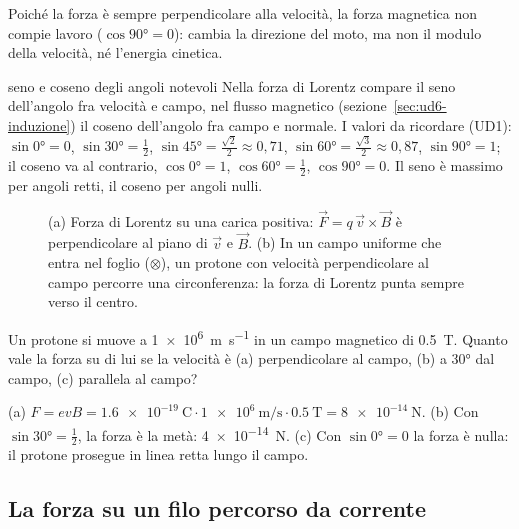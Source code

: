 Poiché la forza è sempre perpendicolare alla velocità, la forza magnetica non compie lavoro ($\cos\ang{90} = 0$): cambia la direzione del moto, ma non il modulo della velocità, né l'energia cinetica.

\begin{richiamo}{seno e coseno degli angoli notevoli}
Nella forza di Lorentz compare il seno dell'angolo fra velocità e campo, nel flusso magnetico (sezione~\ref{sec:ud6-induzione}) il coseno dell'angolo fra campo e normale. I valori da ricordare (UD1): $\sin\ang{0} = 0$, $\sin\ang{30} = \frac12$, $\sin\ang{45} = \frac{\sqrt2}{2} \approx 0{,}71$, $\sin\ang{60} = \frac{\sqrt3}{2} \approx 0{,}87$, $\sin\ang{90} = 1$; il coseno va al contrario, $\cos\ang{0} = 1$, $\cos\ang{60} = \frac12$, $\cos\ang{90} = 0$. Il seno è massimo per angoli retti, il coseno per angoli nulli.
\end{richiamo}

\begin{figure}[h]
\centering

\caption{(a) Forza di Lorentz su una carica positiva: $\vec F = q\,\vec v \times \vec B$ è perpendicolare al piano di $\vec v$ e $\vec B$. (b) In un campo uniforme che entra nel foglio ($\otimes$), un protone con velocità perpendicolare al campo percorre una circonferenza: la forza di Lorentz punta sempre verso il centro.}
\label{fig:ud6-lorentz}
\end{figure}

\begin{esempio}
Un protone si muove a \SI{1e6}{\metre\per\second} in un campo magnetico di \SI{0,5}{\tesla}. Quanto vale la forza su di lui se la velocità è (a) perpendicolare al campo, (b) a \ang{30} dal campo, (c) parallela al campo?

(a) $F = evB = \SI{1,6e-19}{\coulomb} \cdot \SI{1e6}{\metre\per\second} \cdot \SI{0,5}{\tesla} = \SI{8e-14}{\newton}$. (b) Con $\sin\ang{30} = \frac12$, la forza è la metà: \SI{4e-14}{\newton}. (c) Con $\sin\ang{0} = 0$ la forza è nulla: il protone prosegue in linea retta lungo il campo.
\end{esempio}



\subsection{La forza su un filo percorso da corrente}

